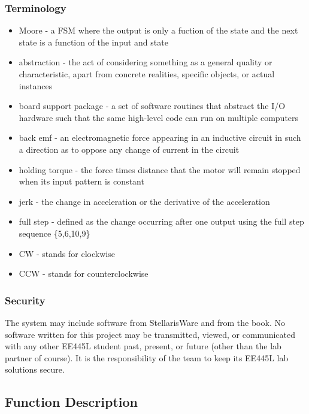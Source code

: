 \documentclass[twoside]{article}
\begin{document}
\subsubsection*{Terminology}
\begin{itemize}
\item{Moore - a FSM where the output is only a fuction of the state and the next state is a function of the input and state}
\item{abstraction - the act of considering something as a general quality or characteristic, apart from concrete realities, specific objects, or actual instances} 
\item{board support package - a set of software routines that abstract the I/O hardware such that the same high-level code can run on multiple computers} 
\item{back emf - an electromagnetic force appearing in an inductive circuit in such a direction as to oppose any change of current in the circuit} 
\item{holding torque - the force times distance that the motor will remain stopped when its input pattern is constant}
\item{jerk - the change in acceleration or the derivative of the acceleration}
\item{full step - defined as the change occurring after one output using the full step sequence \{5,6,10,9\}} 
\item{CW - stands for clockwise} 
\item{CCW - stands for counterclockwise}
\end{itemize}
\subsubsection*{Security}
The system may include software from StellarisWare and from the book. No software written for this project may be transmitted, viewed, or communicated with any other EE445L student past, present, or future (other than the lab partner of course). It is the responsibility of the team to keep its EE445L lab solutions secure.
\subsection*{Function Description}
\end{document}
